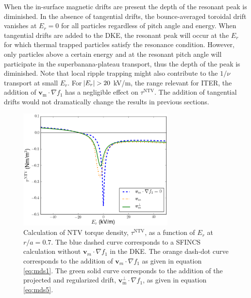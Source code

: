 \documentclass[aip, pop, preprint]{revtex4-1}
\numberwithin{figure}{section}
\numberwithin{equation}{section}
\begin{document}
When the in-surface magnetic drifts are present the depth of the resonant peak is diminished. In the absence of tangential drifts, the bounce-averaged toroidal drift vanishes at $E_r = 0$ for all particles regardless of pitch angle and energy. When tangential drifts are added to the DKE, the resonant peak will occur at the $E_r$ for which thermal trapped particles satisfy the resonance condition. However, only particles above a certain energy and at the resonant pitch angle will participate in the superbanana-plateau transport, thus the depth of the peak is diminished. Note that local ripple trapping might also contribute to the $1/\nu$ transport at small $E_r$. For $\abs{E_r} > 20$ kV/m, the range relevant for ITER, the addition of $\bm{v}_{\mathrm{m}}\cdot \nabla f_1$ has a negligible effect on $\tau^{\mathrm{NTV}}$. The addition of tangential drifts would not dramatically change the results in previous sections.  

\begin{figure}[h!]
\centering
\includegraphics[width=0.7\textwidth]{figure13.eps}
\caption{\label{fig:driftschemes} Calculation of NTV torque density, $\tau^{\mathrm{NTV}}$, as a function of $E_r$ at $r/a = 0.7$. The blue dashed curve corresponds to a SFINCS calculation without $\bm{v}_m \cdot \nabla f_1$ in the DKE. The orange dash-dot curve corresponds to the addition of $\bm{v}_m \cdot \nabla f_1$ as given in equation \ref{eq:mds1}. The green solid curve corresponds to the addition of the projected and regularized drift, $\bm{v}^{\perp}_{\text{m}} \cdot \nabla f_1$, as given in equation \ref{eq:mds5}.}
\end{figure}

\FloatBarrier
\end{document}
